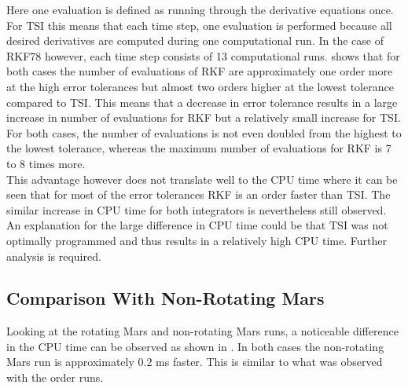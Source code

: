 \noindent
Here one evaluation is defined as running through the derivative equations once. For \ac{TSI} this means that each time step, one evaluation is performed because all desired derivatives are computed during one computational run. In the case of \ac{RKF78} however, each time step consists of 13 computational runs.  shows that for both cases the number of evaluations of \ac{RKF} are approximately one order more at the high error tolerances but almost two orders higher at the lowest tolerance compared to \ac{TSI}. This means that a decrease in error tolerance results in a large increase in number of evaluations for \ac{RKF} but a relatively small increase for \ac{TSI}. For both cases, the number of evaluations is not even doubled from the highest to the lowest tolerance, whereas the maximum number of evaluations for \ac{RKF} is 7 to 8 times more. \\

\noindent
This advantage however does not translate well to the CPU time where it can be seen that for most of the error tolerances \ac{RKF} is an order faster than \ac{TSI}. The similar increase in CPU time for both integrators is nevertheless still observed. An explanation for the large difference in CPU time could be that \ac{TSI} was not optimally programmed and thus results in a relatively high CPU time. Further analysis is required.


%


\subsection{Comparison With Non-Rotating Mars}
\label{subsec:errorToleranceCompNotRot}
Looking at the rotating Mars and non-rotating Mars runs, a noticeable difference in the CPU time can be observed as shown in . In both cases the non-rotating Mars run is approximately 0.2 ms faster. This is similar to what was observed with the order runs.


